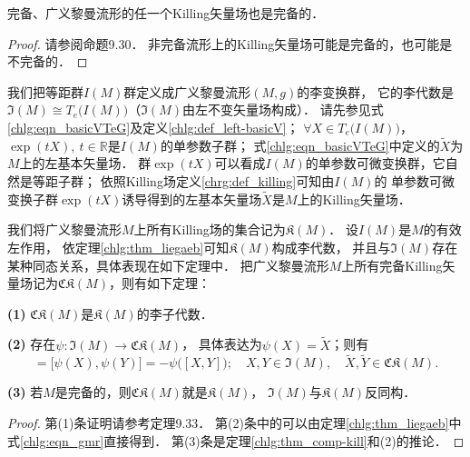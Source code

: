 \begin{theorem}\label{chlg:thm_comp-kill}
    完备、广义黎曼流形的任一个Killing矢量场也是完备的．
\end{theorem}
\begin{proof}
    请参阅\parencite{oneill1983}命题9.30．
    非完备流形上的Killing矢量场可能是完备的，也可能是不完备的．
\end{proof}


我们把等距群$I(M)$群定义成广义黎曼流形$(M,g)$的李变换群，
它的李代数是$\mathfrak{I}(M)\cong T_e\bigl(I(M)\bigr)$（$\mathfrak{I}(M)$由左不变矢量场构成）．
请先参见式\eqref{chlg:eqn_basicVTeG}及定义\ref{chlg:def_left-basicV}；
$\forall X\in T_e\bigl(I(M)\bigr)$，$\exp(t X),\ t\in \mathbb{R}$是$I(M)$的单参数子群；
式\eqref{chlg:eqn_basicVTeG}中定义的$\widetilde{X}$为$M$上的左基本矢量场．
群$\exp(t X)$可以看成$I(M)$的单参数可微变换群，它自然是{\kaishu 等距}子群；
依照Killing场定义\ref{chrg:def_killing}可知由$I(M)$的
单参数可微变换子群$\exp(t X)$诱导得到的左基本矢量场$\widetilde{X}$是$M$上的Killing矢量场．



我们将广义黎曼流形$M$上所有Killing场的集合记为$\mathfrak{K}(M)$．
设$I(M)$是$M$的有效左作用，
依定理\ref{chlg:thm_liegaeb}可知$\mathfrak{K}(M)$构成李代数，
并且与$\mathfrak{I}(M)$存在某种同态关系，具体表现在如下定理中．
把广义黎曼流形$M$上所有{\kaishu 完备}Killing矢量场记为$\mathfrak{CK}(M)$，则有如下定理：
\begin{theorem}\label{chlg:thm_la-killing}
    {\bfseries (1)} $\mathfrak{CK}(M)$是$\mathfrak{K}(M)$的李子代数．
    
    {\bfseries (2)} 存在$\psi:\mathfrak{I}(M) \to \mathfrak{CK}(M)$，
    具体表达为$\psi(X)=\widetilde{X}$；则有
    \begin{equation*}
        [\widetilde{X},\widetilde{Y}]=\bigl[\psi(X),\psi(Y)\bigr]=-\psi\bigl([X,Y]\bigr);
        \quad X,Y\in\mathfrak{I}(M), \quad  
        \widetilde{X},\widetilde{Y} \in \mathfrak{CK}(M).
    \end{equation*}
    
    {\bfseries (3)} 若$M$是完备的，则$\mathfrak{CK}(M)$就是$\mathfrak{K}(M)$，
    $\mathfrak{I}(M)$与$\mathfrak{K}(M)$反同构．
\end{theorem}
\begin{proof}
    第(1)条证明请参考\parencite{oneill1983}定理9.33．
    第(2)条中的可以由定理\ref{chlg:thm_liegaeb}中式\eqref{chlg:eqn_gmr}直接得到．
    第(3)条是定理\ref{chlg:thm_comp-kill}和(2)的推论．
\end{proof}


